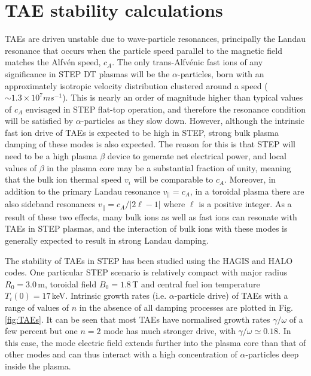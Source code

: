 \documentclass[10pt, a4paper, twoside]{article}
\begin{document}
\section{TAE stability calculations}
\label{sec:halo_work}

TAEs are driven unstable due to wave-particle resonances, principally the Landau resonance that occurs when the particle speed parallel to the magnetic field matches the Alfv\'en speed, $c_A$. The only trans-Alfv\'enic fast ions of any significance in STEP DT plasmas will be the $\alpha$-particles, born with an approximately isotropic velocity distribution clustered around a speed ($\sim 1.3\times10^7\si{ms^{-1}}$). This is nearly an order of magnitude higher than typical values of $c_A$ envisaged in STEP flat-top operation, and therefore the resonance condition will be satisfied by $\alpha$-particles as they slow down. However, although the intrinsic fast ion drive of TAEs is expected to be high in STEP, strong bulk plasma damping of these modes is also expected. The reason for this is that STEP will need to be a high plasma $\beta$ device to generate net electrical power, and local values of $\beta$ in the plasma core may be a substantial fraction of unity, meaning that the bulk ion thermal speed $v_i$ will be comparable to $c_A$. Moreover, in addition to the primary Landau resonance $v_{\parallel}=c_A$, in a toroidal plasma there are also sideband resonances $v_{\parallel} = c_A/\vert 2\ell-1 \vert$ where $\ell$ is a positive integer. As a result of these two effects, many bulk ions as well as fast ions can resonate with TAEs in STEP plasmas, and the interaction of bulk ions with these modes is generally expected to result in strong Landau damping.

The stability of TAEs in STEP has been studied using the HAGIS \cite{pinches1998} and HALO \cite{fitzgerald2020} codes. One particular STEP scenario is relatively compact with major radius $R_0 = 3.0\,$m, toroidal field $B_0 = 1.8\,$T and central fuel ion temperature $T_i(0)=17\,$keV. Intrinsic growth rates (i.e. $\alpha$-particle drive) of TAEs with a range of values of $n$ in the absence of all damping processes are plotted in Fig. \ref{fig:TAEs}. It can be seen that most TAEs have normalised growth rates $\gamma/\omega$ of a few percent but one $n=2$ mode has much stronger drive, with $\gamma/\omega \simeq 0.18$. In this case, the mode electric field extends further into the plasma core than that of other modes and can thus interact with a high concentration of $\alpha$-particles deep inside the plasma. 
\end{document}
